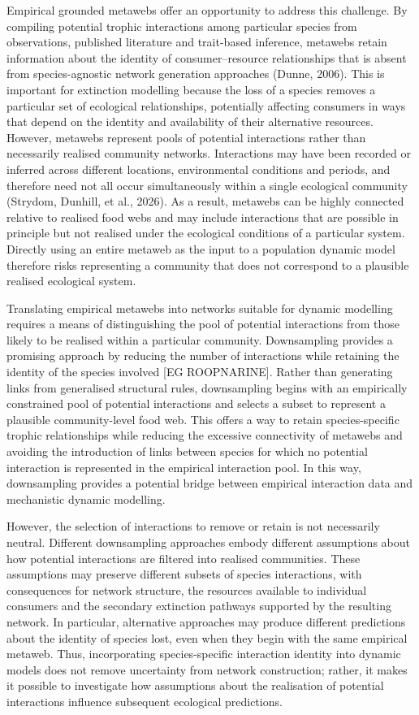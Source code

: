 \documentclass[
]{article}
\begin{document}
Empirical grounded metawebs offer an opportunity to address this
challenge. By compiling potential trophic interactions among particular
species from observations, published literature and trait-based
inference, metawebs retain information about the identity of
consumer--resource relationships that is absent from species-agnostic
network generation approaches (Dunne, 2006). This is important for
extinction modelling because the loss of a species removes a particular
set of ecological relationships, potentially affecting consumers in ways
that depend on the identity and availability of their alternative
resources. However, metawebs represent pools of potential interactions
rather than necessarily realised community networks. Interactions may
have been recorded or inferred across different locations, environmental
conditions and periods, and therefore need not all occur simultaneously
within a single ecological community (Strydom, Dunhill, et al., 2026).
As a result, metawebs can be highly connected relative to realised food
webs and may include interactions that are possible in principle but not
realised under the ecological conditions of a particular system.
Directly using an entire metaweb as the input to a population dynamic
model therefore risks representing a community that does not correspond
to a plausible realised ecological system.

Translating empirical metawebs into networks suitable for dynamic
modelling requires a means of distinguishing the pool of potential
interactions from those likely to be realised within a particular
community. Downsampling provides a promising approach by reducing the
number of interactions while retaining the identity of the species
involved {[}EG ROOPNARINE{]}. Rather than generating links from
generalised structural rules, downsampling begins with an empirically
constrained pool of potential interactions and selects a subset to
represent a plausible community-level food web. This offers a way to
retain species-specific trophic relationships while reducing the
excessive connectivity of metawebs and avoiding the introduction of
links between species for which no potential interaction is represented
in the empirical interaction pool. In this way, downsampling provides a
potential bridge between empirical interaction data and mechanistic
dynamic modelling.

However, the selection of interactions to remove or retain is not
necessarily neutral. Different downsampling approaches embody different
assumptions about how potential interactions are filtered into realised
communities. These assumptions may preserve different subsets of species
interactions, with consequences for network structure, the resources
available to individual consumers and the secondary extinction pathways
supported by the resulting network. In particular, alternative
approaches may produce different predictions about the identity of
species lost, even when they begin with the same empirical metaweb.
Thus, incorporating species-specific interaction identity into dynamic
models does not remove uncertainty from network construction; rather, it
makes it possible to investigate how assumptions about the realisation
of potential interactions influence subsequent ecological predictions.
\end{document}
